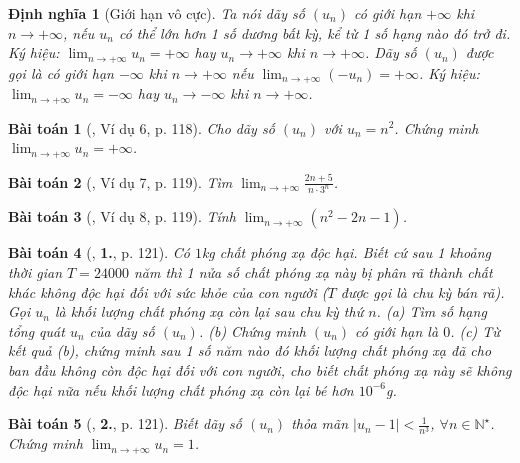 \documentclass{article}
\newtheorem{baitoan}{Bài toán}
\newtheorem{dinhnghia}{Định nghĩa}
\begin{document}
\begin{dinhnghia}[Giới hạn vô cực]
	Ta nói dãy số $(u_n)$ \emph{có giới hạn $+\infty$} khi $n\to+\infty$, nếu $u_n$ có thể lớn hơn 1 số dương bất kỳ, kể từ 1 số hạng nào đó trở đi. Ký hiệu: $\lim_{n\to+\infty} u_n = +\infty$ hay $u_n\to+\infty$ khi $n\to+\infty$. Dãy số $(u_n)$ được gọi là \emph{có giới hạn $-\infty$} khi $n\to+\infty$ nếu $\lim_{n\to+\infty} (-u_n) = +\infty$. Ký hiệu: $\lim_{n\to+\infty} u_n = -\infty$ hay $u_n\to-\infty$ khi $n\to+\infty$.
\end{dinhnghia}

\begin{baitoan}[\cite{SGK_Toan_11_dai_so_giai_tich_co_ban}, Ví dụ 6, p. 118]
	Cho dãy số $(u_n)$ với $u_n = n^2$. Chứng minh $\lim_{n\to+\infty} u_n = +\infty$.
\end{baitoan}

\begin{baitoan}[\cite{SGK_Toan_11_dai_so_giai_tich_co_ban}, Ví dụ 7, p. 119]
	Tìm $\lim_{n\to+\infty} \frac{2n + 5}{n\cdot3^n}$.
\end{baitoan}

\begin{baitoan}[\cite{SGK_Toan_11_dai_so_giai_tich_co_ban}, Ví dụ 8, p. 119]
	Tính $\lim_{n\to+\infty} (n^2 - 2n - 1)$.
\end{baitoan}

\begin{baitoan}[\cite{SGK_Toan_11_dai_so_giai_tich_co_ban}, \textbf{1.}, p. 121]
	Có $1$\emph{kg} chất phóng xạ độc hại. Biết cứ sau 1 khoảng thời gian $T = 24000$ năm thì 1 nửa số chất phóng xạ này bị phân rã thành chất khác không độc hại đối với sức khỏe của con người ($T$ được gọi là \emph{chu kỳ bán rã}). Gọi $u_n$ là khối lượng chất phóng xạ còn lại sau chu kỳ thứ $n$. (a) Tìm số hạng tổng quát $u_n$ của dãy số $(u_n)$. (b) Chứng minh $(u_n)$ có giới hạn là $0$. (c) Từ kết quả (b), chứng minh sau 1 số năm nào đó khối lượng chất phóng xạ đã cho ban đầu không còn độc hại đối với con người, cho biết chất phóng xạ này sẽ không độc hại nữa nếu khối lượng chất phóng xạ còn lại bé hơn $10^{-6}$\emph{g}.
\end{baitoan}

\begin{baitoan}[\cite{SGK_Toan_11_dai_so_giai_tich_co_ban}, \textbf{2.}, p. 121]
	Biết dãy số $(u_n)$ thỏa mãn $|u_n - 1| < \frac{1}{n^3}$, $\forall n\in\mathbb{N}^\star$. Chứng minh $\lim_{n\to+\infty} u_n = 1$.
\end{baitoan}
\end{document}
